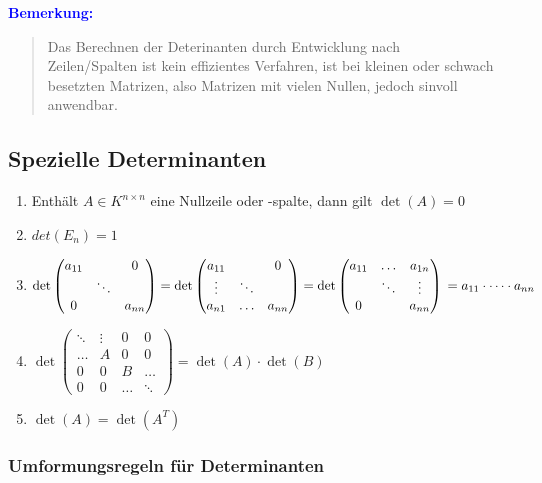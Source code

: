 \documentclass{article}
\newcommand{\blue}[1]{\textcolor{blue}{#1}}
\newcommand{\an}[1]{\blue{\textbf{Bemerkung: }}\begin{quote}#1\end{quote}}
\begin{document}
\an{
    Das Berechnen der Deterinanten durch Entwicklung nach\\
    Zeilen/Spalten ist kein effizientes Verfahren, ist bei kleinen oder schwach besetzten Matrizen, also Matrizen mit vielen Nullen, jedoch sinvoll anwendbar.
}

\subsection{Spezielle Determinanten}

\begin{enumerate}
    \item Enthält $A \in K^{n \times n}$ eine Nullzeile oder -spalte, dann gilt $\det(A) = 0$
    \item $det(E_n) = 1$
    \item $\det \begin{pmatrix}
        a_{11} && 0\\
        & \ddots &\\
        0 && a_{nn}
        \end{pmatrix} = 
        \det \begin{pmatrix}
            a_{11} && 0\\
            \vdots & \ddots &\\
            a_{n1} & \dots & a_{nn}
        \end{pmatrix} =
        \det \begin{pmatrix}
            a_{11} & \dots & a_{1n}\\
            & \ddots & \vdots\\
            0 && a_{nn}
        \end{pmatrix}\\
        \\
        = a_{11} \cdot \dots \cdot a_{nn}$
    \item $\det \begin{pmatrix}
        \ddots & \vdots & 0 & 0\\
        \dots & A & 0 & 0\\
        0 & 0 & B & \dots\\
        0 & 0 & \dots & \ddots
    \end{pmatrix} = \det(A) \cdot \det(B)$
    \item $\det(A) = \det(A^T)$
\end{enumerate}

\subsubsection{Umformungsregeln für Determinanten}
\end{document}
